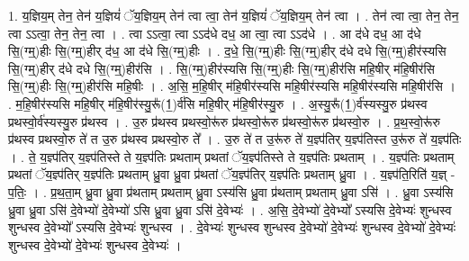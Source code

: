\documentclass[17pt]{extarticle}
\begin{document}
1. य॒ज्ञिय॒म् तेन॒ तेन॑ य॒ज्ञियं॑ ॅय॒ज्ञिय॒म् तेन॑ त्वा त्वा॒ तेन॑ य॒ज्ञियं॑ ॅय॒ज्ञिय॒म् तेन॑ त्वा । . तेन॑ त्वा त्वा॒ तेन॒ तेन॒ त्वा ऽऽत्वा॒ तेन॒ तेन॒ त्वा । . त्वा ऽऽत्वा॒ त्वा ऽऽद॑धे दध॒ आ त्वा॒ त्वा ऽऽद॑धे । . आ द॑धे दध॒ आ द॑धे सि॒(ग्म्॒)हीः सि॒(ग्म्॒)हीर् द॑ध॒ आ द॑धे सि॒(ग्म्॒)हीः । . द॒धे॒ सि॒(ग्म्॒)हीः सि॒(ग्म्॒)हीर् द॑धे दधे सि॒(ग्म्॒)हीर॑स्यसि सि॒(ग्म्॒)हीर् द॑धे दधे सि॒(ग्म्॒)हीर॑सि । . सि॒(ग्म्॒)हीर॑स्यसि सि॒(ग्म्॒)हीः सि॒(ग्म्॒)हीर॑सि महि॒षीर् म॑हि॒षीर॑सि सि॒(ग्म्॒)हीः सि॒(ग्म्॒)हीर॑सि महि॒षीः । . अ॒सि॒ म॒हि॒षीर् म॑हि॒षीर॑स्यसि महि॒षीर॑स्यसि महि॒षीर॑स्यसि महि॒षीर॑सि । . म॒हि॒षीर॑स्यसि महि॒षीर् म॑हि॒षीर॑स्यु॒रू᳚(1॒)र्व॑सि महि॒षीर् म॑हि॒षीर॑स्यु॒रु । . अ॒स्यु॒रू᳚(1॒)र्व॑स्यस्यु॒रु प्र॑थस्व प्रथस्वो॒र्व॑स्यस्यु॒रु प्र॑थस्व । . उ॒रु प्र॑थस्व प्रथस्वो॒रू॑रु प्र॑थस्वो॒रू॑रु प्र॑थस्वो॒रू॑रु प्र॑थस्वो॒रु । . प्र॒थ॒स्वो॒रू॑रु प्र॑थस्व प्रथस्वो॒रु ते॑ त उ॒रु प्र॑थस्व प्रथस्वो॒रु ते᳚ । . उ॒रु ते॑ त उ॒रू॑रु ते॑ य॒ज्ञ्प॑तिर् य॒ज्ञ्प॑तिस्त उ॒रू॑रु ते॑ य॒ज्ञ्प॑तिः । . ते॒ य॒ज्ञ्प॑तिर् य॒ज्ञ्प॑तिस्ते ते य॒ज्ञ्प॑तिः प्रथताम् प्रथतां ॅय॒ज्ञ्प॑तिस्ते ते य॒ज्ञ्प॑तिः प्रथताम् । . य॒ज्ञ्प॑तिः प्रथताम् प्रथतां ॅय॒ज्ञ्प॑तिर् य॒ज्ञ्प॑तिः प्रथताम् ध्रु॒वा ध्रु॒वा प्र॑थतां ॅय॒ज्ञ्प॑तिर् य॒ज्ञ्प॑तिः प्रथताम् ध्रु॒वा । . य॒ज्ञ्प॑ति॒रिति॑ य॒ज्ञ् - प॒तिः॒ । . प्र॒थ॒ता॒म् ध्रु॒वा ध्रु॒वा प्र॑थताम् प्रथताम् ध्रु॒वा ऽस्य॑सि ध्रु॒वा प्र॑थताम् प्रथताम् ध्रु॒वा ऽसि॑ । . ध्रु॒वा ऽस्य॑सि ध्रु॒वा ध्रु॒वा ऽसि॑ दे॒वेभ्यो॑ दे॒वेभ्यो॑ ऽसि ध्रु॒वा ध्रु॒वा ऽसि॑ दे॒वेभ्यः॑ । . अ॒सि॒ दे॒वेभ्यो॑ दे॒वेभ्यो᳚ ऽस्यसि दे॒वेभ्यः॑ शुन्धस्व शुन्धस्व दे॒वेभ्यो᳚ ऽस्यसि दे॒वेभ्यः॑ शुन्धस्व । . दे॒वेभ्यः॑ शुन्धस्व शुन्धस्व दे॒वेभ्यो॑ दे॒वेभ्यः॑ शुन्धस्व दे॒वेभ्यो॑ दे॒वेभ्यः॑ शुन्धस्व दे॒वेभ्यो॑ दे॒वेभ्यः॑ शुन्धस्व दे॒वेभ्यः॑ । \newline
\end{document}
